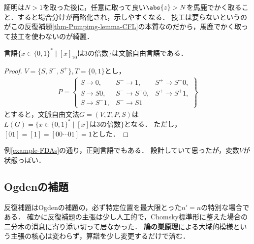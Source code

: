 \begin{remarks}
    証明は$N>1$を取った後に，任意に取って良い$\abs{z}>N$を馬鹿でかく取ること．すると場合分けが簡略化され，示しやすくなる．
    技工は要らないというのがこの反復補題\ref{thm-Pumpimg-lemma-CFL}の本質なのだから，馬鹿でかく取って技工を使わないのが綺麗．
\end{remarks}

\begin{proposition}
    言語$\{x\in\{0,1\}^*\mid [x]_{10}は3の倍数\}$は文脈自由言語である．
\end{proposition}
\begin{proof}
    $V=\{S,S^-,S^+\},T=\{0,1\}$とし，
    \begin{align*}
        P=\left\{\begin{array}{lll}
            S\to 0,&S^-\to 1,&S^+\to S^-0,\\
            S\to S0,&S^-\to S^+0,&S^+\to S^+1,\\
            S\to S^-1,&S^-\to S1
        \end{array}\right\}
    \end{align*}
    とすると，文脈自由文法$G=(V,T,P,S)$は$L(G)=\{x\in\{0,1\}^*\mid [x]は3の倍数\}$となる．
    ただし，$[01]=[1]=[00\cdots 01]=1$とした．
\end{proof}
\begin{remarks}
    例\ref{example-FDAs}の通り，正則言語でもある．
    設計していて思ったが，変数$V$が状態っぽい．
\end{remarks}

\subsection{Ogdenの補題}

\begin{tcolorbox}[colframe=ForestGreen, colback=ForestGreen!10!white, breakable]
    反復補題はOgdenの補題の，必ず特定位置を最大限とった$n'=n$の特別な場合である．
    確かに反復補題の主張は少し人工的で，Chomsky標準形に整えた場合の二分木の消息に寄り添い切って居なかった．
    \textbf{鳩の巣原理}による大域的模様という主張の核心は変わらず，算譜を少し変更するだけで済む．
\end{tcolorbox}

